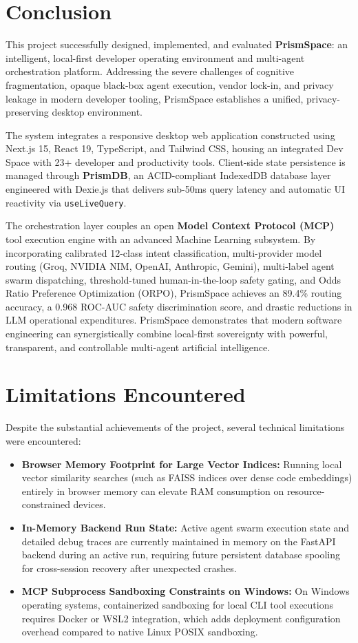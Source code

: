 \documentclass[12pt,a4paper]{report}
\begin{document}
\section{Conclusion}
This project successfully designed, implemented, and evaluated \textbf{PrismSpace}: an intelligent, local-first developer operating environment and multi-agent orchestration platform. Addressing the severe challenges of cognitive fragmentation, opaque black-box agent execution, vendor lock-in, and privacy leakage in modern developer tooling, PrismSpace establishes a unified, privacy-preserving desktop environment.

The system integrates a responsive desktop web application constructed using Next.js 15, React 19, TypeScript, and Tailwind CSS, housing an integrated Dev Space with 23+ developer and productivity tools. Client-side state persistence is managed through \textbf{PrismDB}, an ACID-compliant IndexedDB database layer engineered with Dexie.js that delivers sub-50ms query latency and automatic UI reactivity via \texttt{useLiveQuery}.

The orchestration layer couples an open \textbf{Model Context Protocol (MCP)} tool execution engine with an advanced Machine Learning subsystem. By incorporating calibrated 12-class intent classification, multi-provider model routing (Groq, NVIDIA NIM, OpenAI, Anthropic, Gemini), multi-label agent swarm dispatching, threshold-tuned human-in-the-loop safety gating, and Odds Ratio Preference Optimization (ORPO), PrismSpace achieves an 89.4\% routing accuracy, a 0.968 ROC-AUC safety discrimination score, and drastic reductions in LLM operational expenditures. PrismSpace demonstrates that modern software engineering can synergistically combine local-first sovereignty with powerful, transparent, and controllable multi-agent artificial intelligence.

\section{Limitations Encountered}
Despite the substantial achievements of the project, several technical limitations were encountered:
\begin{itemize}\setlength{\itemsep}{2pt}\setlength{\parskip}{0pt}\setlength{\parsep}{0pt}
    \item \textbf{Browser Memory Footprint for Large Vector Indices:} Running local vector similarity searches (such as FAISS indices over dense code embeddings) entirely in browser memory can elevate RAM consumption on resource-constrained devices.
    \item \textbf{In-Memory Backend Run State:} Active agent swarm execution state and detailed debug traces are currently maintained in memory on the FastAPI backend during an active run, requiring future persistent database spooling for cross-session recovery after unexpected crashes.
    \item \textbf{MCP Subprocess Sandboxing Constraints on Windows:} On Windows operating systems, containerized sandboxing for local CLI tool executions requires Docker or WSL2 integration, which adds deployment configuration overhead compared to native Linux POSIX sandboxing.
\end{itemize}
\end{document}
